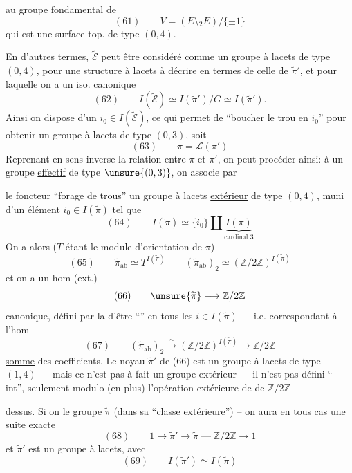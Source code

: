 
au groupe fondamental de
\[
(61)\qquad V=(E\setminus {}_2E)/\{\pm1\}
\]
qui est une surface top. de type $(0,4)$.

En d'autres termes, $\widetilde{\mathcal E}$ peut être considéré comme un groupe à lacets de type $(0,4)$, pour une structure à lacets  à décrire en termes de celle de $\widetilde{\pi}'$, et pour laquelle on a un iso. canonique
\[
(62)\qquad I(\widetilde{\mathcal E})\simeq I(\widetilde{\pi}')/G\simeq I(\widetilde{\pi}').
\]
Ainsi on dispose d'un $i_0\in I(\widetilde{\mathcal E})$, ce qui permet de ``boucher le trou en $i_0$'' pour obtenir un groupe  à lacets de type $(0,3)$, soit \deleted{$\unsure{\pi=}$}
\[
(63)\qquad \pi=\mathcal L(\pi')
\]
Reprenant en sens inverse la relation entre $\pi$ et $\pi'$, on peut procéder ainsi: à un groupe  \uline{effectif} de type $\unsure{(0,3)}$, on associe par


le foncteur ``forage de trous'' un groupe à lacets \uline{extérieur}  de type $(0,4)$, muni d'un élément $i_0\in I(\widetilde{\pi})$ tel que 
\[
(64)\qquad I(\widetilde{\pi})\simeq\{i_0\}\amalg\underbrace{I(\pi)}_{\text{cardinal }3}
\]
On a alors ($T$ étant le module d'orientation de $\pi$)
\[
(65)\qquad \widetilde{\pi}_{\mathrm{ab}}\simeq T^{I(\widetilde{\pi})}\qquad (\widetilde{\pi}_{\mathrm{ab}})_2\simeq(\mathbb Z/2\mathbb Z)^{I(\widetilde{\pi})}
\]
et on a un hom (ext.)
\[
(66)\qquad \unsure{\widetilde{\pi}}\longrightarrow\mathbb Z/2\mathbb Z
\]
canonique, défini par la  d'être ``'' en tous les $i\in I(\widetilde{\pi})$ --- i.e. correspondant à l'hom
\[
(67)\qquad (\widetilde{\pi}_{\mathrm{ab}})_2\xrightarrow{\sim}(\mathbb Z/2\mathbb Z)^{I(\widetilde{\pi})}\longrightarrow\mathbb Z/2\mathbb Z
\]
\uline{somme} des coefficients. Le noyau $\widetilde{\pi}'$ de (66) est un groupe à lacets de type $(1,4)$ --- mais ce n'est pas  à fait un groupe extérieur --- il n'est pas défini ``  int'',  seulement modulo (en plus) l'opération extérieure de  de $\mathbb Z/2\mathbb Z$



dessus. Si on  le groupe $\widetilde{\pi}$ (dans sa ``classe extérieure'') -- on aura en tous cas une suite exacte
\[
(68)\qquad 1\longrightarrow\widetilde{\pi}'\longrightarrow\widetilde{\pi}\mathrel{\text{---}}\mathbb Z/2\mathbb Z\longrightarrow 1
\]
et $\widetilde{\pi}'$ est un groupe à lacets, avec
\[
(69)\qquad I(\widetilde{\pi}')\simeq I(\widetilde{\pi})
\]

